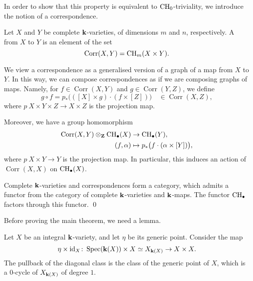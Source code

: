 In order to show that this property is equivalent to $\mathrm{CH}_0$-triviality,
we introduce the notion of a correspondence.

\begin{definition}
    Let $X$ and $Y$ be complete $\bbk$-varieties, of dimensions $m$ and $n$, respectively.
    A  from $X$ to $Y$ is an element of the set 
    \[ \operatorname{Corr} (X, Y) = \mathrm{CH}_m (X \times Y). \]
\end{definition}

We view a correspondence as a generalised version of
a graph of a map from $X$ to $Y$.
In this way, we can compose correspondences as if we are composing graphs of maps.
Namely, for $f \in \operatorname{Corr} (X, Y)$ and $g \in \operatorname{Corr} (Y, Z)$,
we define
\[ g \circ f = p_* \bigl( ([X] \times g) \cdot (f \times [Z]) \bigr)
    \quad \in \operatorname{Corr} (X, Z), \]
where $p \: X \times Y \times Z \to X \times Z$ is the projection map.

Moreover, we have a group homomorphism
\begin{equation} \label{eq-2-corresp-eval}
    \begin{aligned}
        \operatorname{Corr} (X, Y) \otimes_{\bbZ} \CH_\bullet (X) & \to \CH_\bullet (Y), \\
        (f, \alpha) & \mapsto p_* \bigl( f \cdot (\alpha \times [Y]) \bigr),
    \end{aligned}
\end{equation}
where $p \: X \times Y \to Y$ is the projection map.
In particular, this induces an action of $\operatorname{Corr} (X, X)$ on $\mathrm{CH}_\bullet (X)$.

\begin{proposition}
    Complete $\bbk$-varieties and correspondences form a category,
    which admits a functor from the category of
    complete $\bbk$-varieties and $\bbk$-maps.
    The functor $\mathrm{CH}_\bullet$ factors through this functor. \qed
\end{proposition}

Before proving the main theorem,
we need a lemma.

\begin{lemma} \label{lem-2-generic-pt}
    Let $X$ be an integral $\bbk$-variety, and let $\eta$ be its generic point. Consider the map
    \[ \eta \times \id_X \: \Spec ( \bbk (X) ) \times X \simeq X_{\bbk (X)} \to X \times X. \]
    The pullback of the diagonal class is the class of the generic point of $X$, which is a $0$-cycle of $X_{\bbk (X)}$ of degree $1$.
\end{lemma}

